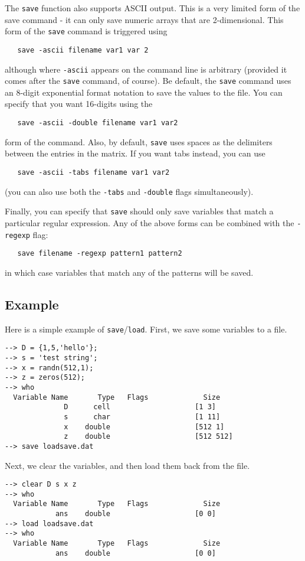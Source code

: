 The \verb|save| function also supports ASCII output.  This is a very limited
form of the save command - it can only save numeric arrays that are
2-dimensional.  This form of the \verb|save| command is triggered using
\begin{verbatim}
   save -ascii filename var1 var 2
\end{verbatim}
although where \verb|-ascii| appears on the command line is arbitrary (provided
it comes after the \verb|save| command, of course).  Be default, the \verb|save|
command uses an 8-digit exponential format notation to save the values to
the file.  You can specify that you want 16-digits using the
\begin{verbatim}
   save -ascii -double filename var1 var2
\end{verbatim}
form of the command.  Also, by default, \verb|save| uses spaces as the 
delimiters between the entries in the matrix.  If you want tabs instead,
you can use
\begin{verbatim}
   save -ascii -tabs filename var1 var2
\end{verbatim}
(you can also use both the \verb|-tabs| and \verb|-double| flags simultaneously).

Finally, you can specify that \verb|save| should only save variables that
match a particular regular expression.  Any of the above forms can be
combined with the \verb|-regexp| flag:
\begin{verbatim}
   save filename -regexp pattern1 pattern2
\end{verbatim}
in which case variables that match any of the patterns will be saved.
\subsection{Example}

Here is a simple example of \verb|save|/\verb|load|.  First, we save some 
variables to a file.
\begin{verbatim}
--> D = {1,5,'hello'};
--> s = 'test string';
--> x = randn(512,1);
--> z = zeros(512);
--> who
  Variable Name       Type   Flags             Size
              D      cell                    [1 3]
              s      char                    [1 11]
              x    double                    [512 1]
              z    double                    [512 512]
--> save loadsave.dat
\end{verbatim}
Next, we clear the variables, and then load them back from the file.
\begin{verbatim}
--> clear D s x z
--> who
  Variable Name       Type   Flags             Size
            ans    double                    [0 0]
--> load loadsave.dat
--> who
  Variable Name       Type   Flags             Size
            ans    double                    [0 0]
\end{verbatim}
